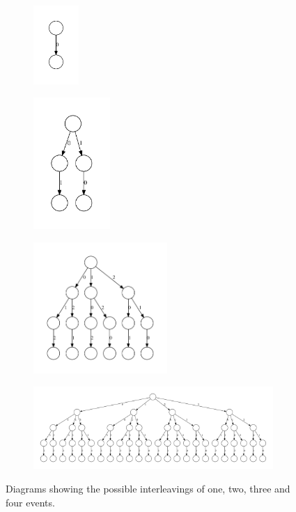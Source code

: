 \documentclass[12pt,a4paper,twoside,openright]{report}
\begin{document}
\begin{figure}
	\centering
	\begin{subfigure}{0.15\textwidth}
		\centering
		\includegraphics*[height=3cm]{explosion1}
	\end{subfigure}
	\quad
	\begin{subfigure}{0.25\textwidth}
		\centering
		\includegraphics*[height=5cm]{explosion2}
	\end{subfigure}
	\quad
	\begin{subfigure}{0.5\textwidth}
		\centering
		\includegraphics*[height=5cm]{explosion3}
	\end{subfigure}
	\begin{subfigure}{\textwidth}
		\centering
		\includegraphics*[width=\textwidth]{explosion4}
	\end{subfigure}
	\caption[Illustration of the state explosion problem.]
		{Diagrams showing the possible interleavings of
			one, two, three and four events.}
	\label{fig:state-explosion}
\end{figure}
\end{document}
